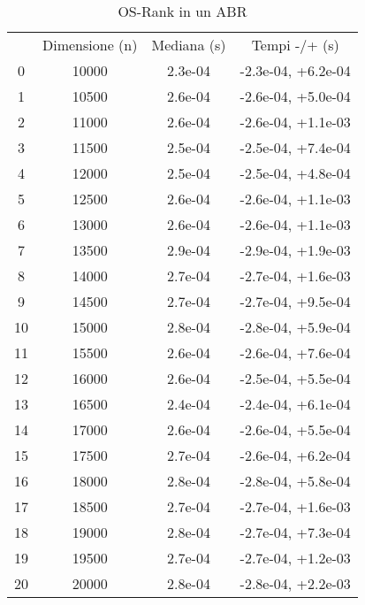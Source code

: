 \begin{table}
\centering
\caption{OS-Rank in un ABR}
\label{OS-Rank in un ABR}
\begin{adjustbox}{width=1\textwidth/2}
\begin{tabular}{|c|c|c|c|}
\hline
 & Dimensione (n) & Mediana (s) & Tempi -/+ (s) \\
0 & 10000 & 2.3e-04 & -2.3e-04, +6.2e-04 \\
\cline{1-4}
1 & 10500 & 2.6e-04 & -2.6e-04, +5.0e-04 \\
\cline{1-4}
2 & 11000 & 2.6e-04 & -2.6e-04, +1.1e-03 \\
\cline{1-4}
3 & 11500 & 2.5e-04 & -2.5e-04, +7.4e-04 \\
\cline{1-4}
4 & 12000 & 2.5e-04 & -2.5e-04, +4.8e-04 \\
\cline{1-4}
5 & 12500 & 2.6e-04 & -2.6e-04, +1.1e-03 \\
\cline{1-4}
6 & 13000 & 2.6e-04 & -2.6e-04, +1.1e-03 \\
\cline{1-4}
7 & 13500 & 2.9e-04 & -2.9e-04, +1.9e-03 \\
\cline{1-4}
8 & 14000 & 2.7e-04 & -2.7e-04, +1.6e-03 \\
\cline{1-4}
9 & 14500 & 2.7e-04 & -2.7e-04, +9.5e-04 \\
\cline{1-4}
10 & 15000 & 2.8e-04 & -2.8e-04, +5.9e-04 \\
\cline{1-4}
11 & 15500 & 2.6e-04 & -2.6e-04, +7.6e-04 \\
\cline{1-4}
12 & 16000 & 2.6e-04 & -2.5e-04, +5.5e-04 \\
\cline{1-4}
13 & 16500 & 2.4e-04 & -2.4e-04, +6.1e-04 \\
\cline{1-4}
14 & 17000 & 2.6e-04 & -2.6e-04, +5.5e-04 \\
\cline{1-4}
15 & 17500 & 2.7e-04 & -2.6e-04, +6.2e-04 \\
\cline{1-4}
16 & 18000 & 2.8e-04 & -2.8e-04, +5.8e-04 \\
\cline{1-4}
17 & 18500 & 2.7e-04 & -2.7e-04, +1.6e-03 \\
\cline{1-4}
18 & 19000 & 2.8e-04 & -2.7e-04, +7.3e-04 \\
\cline{1-4}
19 & 19500 & 2.7e-04 & -2.7e-04, +1.2e-03 \\
\cline{1-4}
20 & 20000 & 2.8e-04 & -2.8e-04, +2.2e-03 \\
\cline{1-4}
\end{tabular}
\end{adjustbox}
\end{table}
